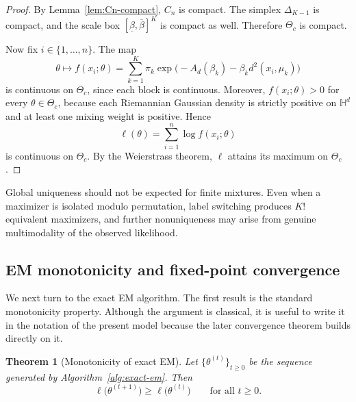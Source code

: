 \documentclass[11pt]{article}
\newtheorem{theorem}{Theorem}[section]
\begin{document}
\begin{proof}
By Lemma~\ref{lem:Cn-compact}, \(C_n\) is compact. The simplex \(\Delta_{K-1}\) is compact, and the scale box \([\underline{\beta},\overline{\beta}]^K\) is compact as well. Therefore \(\Theta_c\) is compact.

Now fix \(i\in\{1,\ldots,n\}\). The map
\[
\theta\mapsto
f(x_i;\theta)
=
\sum_{k=1}^K
\pi_k
\exp\!\bigl(
-A_d(\beta_k)-\beta_k d^2(x_i,\mu_k)
\bigr)
\]
is continuous on \(\Theta_c\), since each block is continuous. Moreover, \(f(x_i;\theta)>0\) for every \(\theta\in\Theta_c\), because each Riemannian Gaussian density is strictly positive on \(\mathbb{H}^d\) and at least one mixing weight is positive. Hence
\[
\ell(\theta)=\sum_{i=1}^n \log f(x_i;\theta)
\]
is continuous on \(\Theta_c\). By the Weierstrass theorem, \(\ell\) attains its maximum on \(\Theta_c\).
\end{proof}

Global uniqueness should not be expected for finite mixtures. Even when a maximizer is isolated modulo permutation, label switching produces \(K!\) equivalent maximizers, and further nonuniqueness may arise from genuine multimodality of the observed likelihood.

\subsection{EM monotonicity and fixed-point convergence}\label{subsec:em-theory}

We next turn to the exact EM algorithm. The first result is the standard monotonicity property. Although the argument is classical, it is useful to write it in the notation of the present model because the later convergence theorem builds directly on it.

\begin{theorem}[Monotonicity of exact EM]\label{thm:em-monotonicity}
Let \(\{\theta^{(t)}\}_{t\ge 0}\) be the sequence generated by Algorithm~\ref{alg:exact-em}. Then
\begin{equation}\label{eq:em-monotonicity}
\ell\bigl(\theta^{(t+1)}\bigr)\ge \ell\bigl(\theta^{(t)}\bigr)
\qquad\text{for all }t\ge 0.
\end{equation}
\end{theorem}
\end{document}
